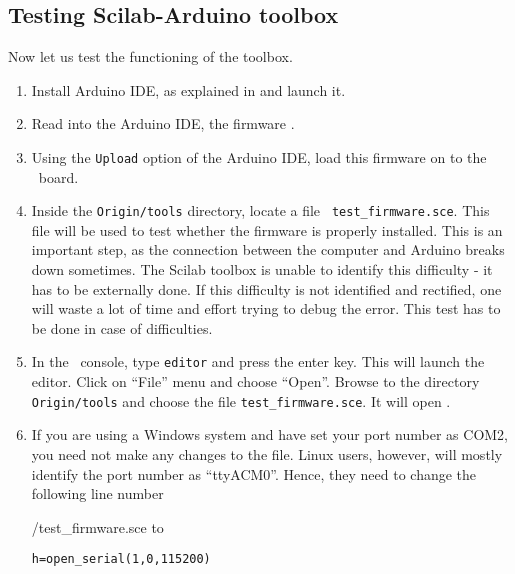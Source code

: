\subsection{Testing Scilab-Arduino toolbox}
\label{sec:testing-scilab-arduino}
Now let us test the functioning of the toolbox. 
\begin{enumerate}
      \item Install Arduino IDE, as explained in  and
            launch it.
      \item Read into the Arduino IDE, the firmware .
      \item Using the {\tt Upload} option of the Arduino IDE, load this
            firmware on to the \arduino\ board.
      \item Inside the {\tt Origin/tools} directory, locate a file {\tt
                        test\_firmware.sce}. This file will be used to test whether the
            firmware is properly installed.  This is an important step, as the
            connection between the computer and Arduino breaks down sometimes.
            The Scilab toolbox is unable to identify this difficulty - it has to
            be externally done.  If this difficulty is not identified and
            rectified, one will waste a lot of time and effort trying to debug
            the error.  This test has to be done in case of difficulties.
      \item In the \scilab\ console, type {\tt editor} and press the enter
            key. This will launch the editor. Click on ``File'' menu and choose
            ``Open''. Browse to the directory {\tt Origin/tools} and choose the
            file {\tt test\_firmware.sce}.  It will open
            .  
            
      \item If you are using a Windows system and have set your port number
            as COM2, you need not make any changes to the file. Linux users,
            however, will mostly identify the port number as ``ttyACM0''. Hence, 
            they need to change the following line number
            
            {\LocSWchkcode/test_firmware.sce}
            to
            \begin{lstlisting}[style=nonumbers]
  h=open_serial(1,0,115200)
\end{lstlisting}
            

\end{enumerate}
